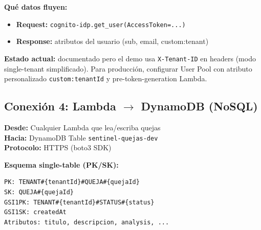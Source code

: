 \documentclass[11pt,a4paper]{article}
\begin{document}
\begin{center}
\end{center}

\textbf{Qu\'e datos fluyen:}
\begin{itemize}[leftmargin=*]
  \item \textbf{Request:} \texttt{cognito-idp.get\_user(AccessToken=...)}
  \item \textbf{Response:} atributos del usuario (sub, email, custom:tenant)
\end{itemize}

\textbf{Estado actual:} documentado pero el demo usa \texttt{X-Tenant-ID} en headers
(modo single-tenant simplificado). Para producci\'on, configurar User Pool con
atributo personalizado \texttt{custom:tenantId} y pre-token-generation Lambda.

\subsection{Conexi\'on 4: Lambda $\rightarrow$ DynamoDB (NoSQL)}

\begin{tcolorbox}[colback=blue!5, colframe=clientblue, title=\textbf{Desde $\rightarrow$ Hasta}]
\textbf{Desde:} Cualquier Lambda que lea/escriba quejas \\
\textbf{Hacia:} DynamoDB Table \texttt{sentinel-quejas-dev} \\
\textbf{Protocolo:} HTTPS (boto3 SDK)
\end{tcolorbox}

\begin{center}
\end{center}

\textbf{Esquema single-table (PK/SK):}
\begin{lstlisting}[basicstyle=\ttfamily\footnotesize, frame=single]
PK: TENANT#{tenantId}#QUEJA#{quejaId}
SK: QUEJA#{quejaId}
GSI1PK: TENANT#{tenantId}#STATUS#{status}
GSI1SK: createdAt
Atributos: titulo, descripcion, analysis, ...
\end{lstlisting}
\end{document}
